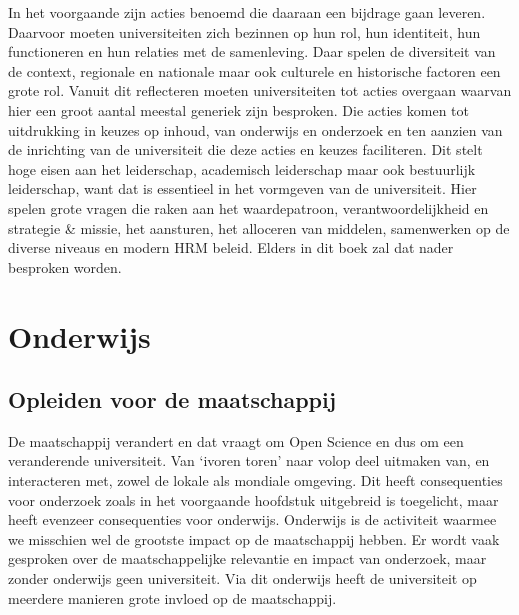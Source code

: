 \documentclass[empirical, authordate, ]{new-jote-article}
\begin{document}
	In het voorgaande zijn acties benoemd die daaraan een bijdrage gaan leveren. Daarvoor moeten universiteiten zich bezinnen op hun rol, hun identiteit, hun functioneren en hun relaties met de samenleving. Daar spelen de diversiteit van de context, regionale en nationale maar ook culturele en historische factoren een grote rol. Vanuit dit reflecteren moeten universiteiten tot acties overgaan waarvan hier een groot aantal meestal generiek zijn besproken. Die acties komen tot uitdrukking in keuzes op inhoud, van onderwijs en onderzoek en ten aanzien van de inrichting van de universiteit die deze acties en keuzes faciliteren. Dit stelt hoge eisen aan het leiderschap, academisch leiderschap maar ook bestuurlijk leiderschap, want dat is essentieel in het vormgeven van de universiteit. Hier spelen grote vragen die raken aan het waardepatroon, verantwoordelijkheid en strategie \& missie, het aansturen, het alloceren van middelen, samenwerken op de diverse niveaus en modern HRM beleid. Elders in dit boek zal dat nader besproken worden.







	\chapter{Onderwijs}



















	\section{Opleiden voor de maatschappij}



	De maatschappij verandert en dat vraagt om Open Science en dus om een veranderende universiteit. Van ‘ivoren toren' naar volop deel uitmaken van, en interacteren met, zowel de lokale als mondiale omgeving. Dit heeft consequenties voor onderzoek zoals in het voorgaande hoofdstuk uitgebreid is toegelicht, maar heeft evenzeer consequenties voor onderwijs. Onderwijs is de activiteit waarmee we misschien wel de grootste impact op de maatschappij hebben. Er wordt vaak gesproken over de maatschappelijke relevantie en impact van onderzoek, maar zonder onderwijs geen universiteit. Via dit onderwijs heeft de universiteit op meerdere manieren grote invloed op de maatschappij.
\end{document}

